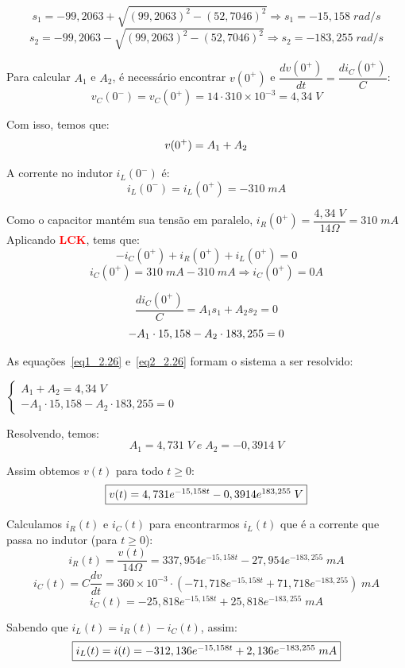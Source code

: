 \documentclass[
	12pt,				%
	oneside,			%
	a4paper,			%
	english,			%
	french,				%
	spanish,			%
	brazil				%
	]{abntex2}
\begin{document}
$$s_1=-99,2063 + \sqrt{(99,2063)^2-(52,7046)^2} \Longrightarrow s_1=-15,158 \;rad/s$$
$$s_2=-99,2063 - \sqrt{(99,2063)^2-(52,7046)^2} \Longrightarrow s_2=-183,255 \;rad/s$$

Para calcular $A_1$ e $A_2$, é necessário encontrar $v(0^+)$ e $\dfrac{dv(0^+)}{dt} = \dfrac{di_C(0^+)}{C}$:
$$v_C(0^-) = v_C(0^+) = 14\cdot310\times10^{-3} = 4,34\;V$$

Com isso, temos que:
\begin{equation}
    \centering
    v(0^+) = A_1 + A_2
    \label{eq1_2.26}
\end{equation}

A corrente no indutor $i_L(0^-)$ é:
$$i_L(0^-) = i_L(0^+) = -310\;mA$$

Como o capacitor mantém sua tensão em paralelo, $i_R(0^+) = \dfrac{4,34\;V}{14\Omega}=310\;mA$
\newpage
Aplicando \textbf{\textcolor{red}{LCK}}, tems que:
$$-i_C(0^+) + i_R(0^+) + i_L(0^+) = 0$$
$$i_C(0^+) = 310\;mA - 310\;mA \Longrightarrow i_C(0^+) = 0 A$$

$$\dfrac{di_C(0^+)}{C} = A_1s_1+A_2s_2 = 0$$
\begin{equation}
    \centering
    -A_1\cdot15,158 - A_2\cdot183,255 = 0
    \label{eq2_2.26}
\end{equation}

As equações~\eqref{eq1_2.26} e~\eqref{eq2_2.26} formam o sistema a ser resolvido:

$\begin{cases}
    A_1 + A_2 = 4,34\;V\\
    -A_1\cdot15,158 - A_2\cdot183,255 = 0
\end{cases}$

Resolvendo, temos:
$$A_1=4,731\;V \; e \; A_2=-0,3914\;V$$

Assim obtemos $v(t)$ para todo $t\geq0$:
\begin{equation}
    \centering
    \fbox{$v(t) = 4,731e^{-15,158t} - 0,3914e^{183,255} \; V$}
\end{equation}

Calculamos $i_R(t)$ e $i_C(t)$ para encontrarmos $i_L(t)$ que é a corrente que passa no indutor (para $t\geq0$):
$$i_R(t) = \dfrac{v(t)}{14\Omega} = 337,954e^{-15,158t} - 27,954e^{-183,255} \; mA$$
$$i_C(t) = C\dfrac{dv}{dt} = 360\times10^{-3}\cdot\left(-71,718e^{-15,158t} + 71,718e^{-183,255}\right) \; mA$$
$$i_C(t) = -25,818e^{-15,158t} + 25,818e^{-183,255} \; mA$$

Sabendo que $i_L(t) = i_R(t) - i_C(t)$, assim:
\begin{equation}
    \centering
    \fbox{$i_L(t) = i(t) = -312,136e^{-15,158t} + 2,136e^{-183,255} \; mA$}
\end{equation}
\end{document}
